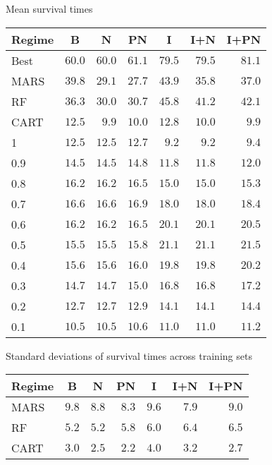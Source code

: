 \documentclass{beamer}
\begin{document}
\appendix

\begin{frame}[c]{Mean survival times}
  \begin{table}
  \small
  \centering
  \begin{tabular}{lrrrrrr}
  \toprule \multicolumn{1}{c}{Regime}&\multicolumn{1}{c}{B}&\multicolumn{1}{c}{N}&\multicolumn{1}{c}{PN}&\multicolumn{1}{c}{I}&\multicolumn{1}{c}{I+N}&\multicolumn{1}{c}{I+PN}\tabularnewline
  \midrule
  Best&$60.0$&$60.0$&$61.1$&$79.5$&$79.5$&$81.1$\tabularnewline
  MARS&$39.8$&$29.1$&$27.7$&$43.9$&$35.8$&$37.0$\tabularnewline
  RF&$36.3$&$30.0$&$30.7$&$45.8$&$41.2$&$42.1$\tabularnewline
  CART&$12.5$&$ 9.9$&$10.0$&$12.8$&$10.0$&$ 9.9$\tabularnewline
  1&$12.5$&$12.5$&$12.7$&$ 9.2$&$ 9.2$&$ 9.4$\tabularnewline
  0.9&$14.5$&$14.5$&$14.8$&$11.8$&$11.8$&$12.0$\tabularnewline
  0.8&$16.2$&$16.2$&$16.5$&$15.0$&$15.0$&$15.3$\tabularnewline
  0.7&$16.6$&$16.6$&$16.9$&$18.0$&$18.0$&$18.4$\tabularnewline
  0.6&$16.2$&$16.2$&$16.5$&$20.1$&$20.1$&$20.5$\tabularnewline
  0.5&$15.5$&$15.5$&$15.8$&$21.1$&$21.1$&$21.5$\tabularnewline
  0.4&$15.6$&$15.6$&$16.0$&$19.8$&$19.8$&$20.2$\tabularnewline
  0.3&$14.7$&$14.7$&$15.0$&$16.8$&$16.8$&$17.2$\tabularnewline
  0.2&$12.7$&$12.7$&$12.9$&$14.1$&$14.1$&$14.4$\tabularnewline
  0.1&$10.5$&$10.5$&$10.6$&$11.0$&$11.0$&$11.2$\tabularnewline
  \bottomrule
  \end{tabular}
  \end{table}
\end{frame}

\begin{frame}{Standard deviations of survival times across training sets}
  \begin{table}[!htbp]
  \centering
  \begin{tabular}{lrrrrrr}
  \toprule \multicolumn{1}{c}{Regime}&\multicolumn{1}{c}{B}&\multicolumn{1}{c}{N}&\multicolumn{1}{c}{PN}&\multicolumn{1}{c}{I}&\multicolumn{1}{c}{I+N}&\multicolumn{1}{c}{I+PN}\tabularnewline
  \midrule
  MARS&$9.8$&$8.8$&$8.3$&$9.6$&$7.9$&$9.0$\tabularnewline
  RF&$5.2$&$5.2$&$5.8$&$6.0$&$6.4$&$6.5$\tabularnewline
  CART&$3.0$&$2.5$&$2.2$&$4.0$&$3.2$&$2.7$\tabularnewline
  \bottomrule
  \end{tabular}
  \end{table}
\end{frame}
\end{document}
